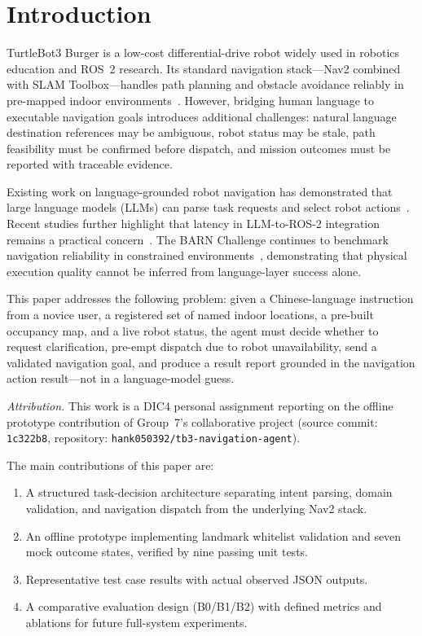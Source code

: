 \documentclass[conference]{IEEEtran}
\begin{document}
\section{Introduction}

TurtleBot3 Burger is a low-cost differential-drive robot widely used in robotics
education and ROS~2 research. Its standard navigation stack---Nav2 combined with
SLAM Toolbox---handles path planning and obstacle avoidance reliably in pre-mapped
indoor environments~\cite{macenski2020marathon,macenski2021slam}. However, bridging
human language to executable navigation goals introduces additional challenges:
natural language destination references may be ambiguous, robot status may be stale,
path feasibility must be confirmed before dispatch, and mission outcomes must be
reported with traceable evidence.

Existing work on language-grounded robot navigation has demonstrated that large
language models (LLMs) can parse task requests and select robot actions~\cite{yao2023react,ahn2022saycan}.
Recent studies further highlight that latency in LLM-to-ROS-2 integration remains a
practical concern~\cite{pollini2025latency}. The BARN Challenge continues to benchmark
navigation reliability in constrained environments~\cite{xiao2022barn,xiao2026barn},
demonstrating that physical execution quality cannot be inferred from language-layer
success alone.

This paper addresses the following problem: given a Chinese-language instruction from
a novice user, a registered set of named indoor locations, a pre-built occupancy map,
and a live robot status, the agent must decide whether to request clarification,
pre-empt dispatch due to robot unavailability, send a validated navigation goal, and
produce a result report grounded in the navigation action result---not in a
language-model guess.

\smallskip\noindent\textit{Attribution.} This work is a DIC4 personal assignment
reporting on the offline prototype contribution of Group~7's collaborative project
(source commit: \texttt{1c322b8}, repository: \texttt{hank050392/tb3-navigation-agent}).

The main contributions of this paper are:
\begin{enumerate}
  \item A structured task-decision architecture separating intent parsing, domain
        validation, and navigation dispatch from the underlying Nav2 stack.
  \item An offline prototype implementing landmark whitelist validation and seven
        mock outcome states, verified by nine passing unit tests.
  \item Representative test case results with actual observed JSON outputs.
  \item A comparative evaluation design (B0/B1/B2) with defined metrics and
        ablations for future full-system experiments.
\end{enumerate}
\end{document}
